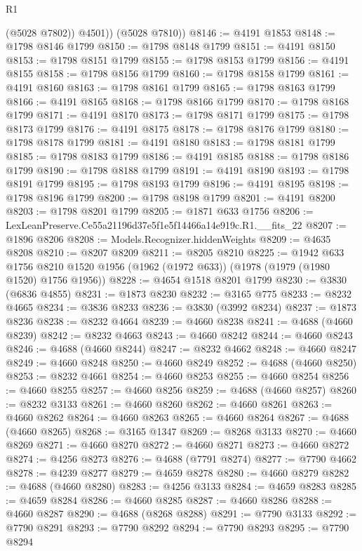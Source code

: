 \begin{lexlean}{R1}
\begin{coremodule}
            (@5028 @7802))
          @4501))
      (@5028 @7810))
@8146 := @4191 @1853
@8148 := @1798 @8146 @1799
@8150 := @1798 @8148 @1799
@8151 := @4191 @8150
@8153 := @1798 @8151 @1799
@8155 := @1798 @8153 @1799
@8156 := @4191 @8155
@8158 := @1798 @8156 @1799
@8160 := @1798 @8158 @1799
@8161 := @4191 @8160
@8163 := @1798 @8161 @1799
@8165 := @1798 @8163 @1799
@8166 := @4191 @8165
@8168 := @1798 @8166 @1799
@8170 := @1798 @8168 @1799
@8171 := @4191 @8170
@8173 := @1798 @8171 @1799
@8175 := @1798 @8173 @1799
@8176 := @4191 @8175
@8178 := @1798 @8176 @1799
@8180 := @1798 @8178 @1799
@8181 := @4191 @8180
@8183 := @1798 @8181 @1799
@8185 := @1798 @8183 @1799
@8186 := @4191 @8185
@8188 := @1798 @8186 @1799
@8190 := @1798 @8188 @1799
@8191 := @4191 @8190
@8193 := @1798 @8191 @1799
@8195 := @1798 @8193 @1799
@8196 := @4191 @8195
@8198 := @1798 @8196 @1799
@8200 := @1798 @8198 @1799
@8201 := @4191 @8200
@8203 := @1798 @8201 @1799
@8205 := @1871 @633 @1756
@8206 := LexLeanPreserve.Ce55a21196d37e5f1e5f14466a14e919c.R1.__fits_22
@8207 := @1896 @8206
@8208 := Models.Recognizer.hiddenWeights
@8209 := @4635 @8208
@8210 := @8207 @8209
@8211 := @8205 @8210
@8225 := @1942
    @633
    @1756
    @8210
    @1520
    @1956
    (@1962 (@1972 @633))
    (@1978 (@1979 (@1980 @1520) @1756 @1956))
@8228 := @4654 @1518 @8201 @1799
@8230 := @3830 (@6836 @4855)
@8231 := @1873 @8230
@8232 := @3165 @775
@8233 := @8232 @4665
@8234 := @3836 @8233
@8236 := @3830 (@3992 @8234)
@8237 := @1873 @8236
@8238 := @8232 @4664
@8239 := @4660 @8238
@8241 := @4688 (@4660 @8239)
@8242 := @8232 @4663
@8243 := @4660 @8242
@8244 := @4660 @8243
@8246 := @4688 (@4660 @8244)
@8247 := @8232 @4662
@8248 := @4660 @8247
@8249 := @4660 @8248
@8250 := @4660 @8249
@8252 := @4688 (@4660 @8250)
@8253 := @8232 @4661
@8254 := @4660 @8253
@8255 := @4660 @8254
@8256 := @4660 @8255
@8257 := @4660 @8256
@8259 := @4688 (@4660 @8257)
@8260 := @8232 @3133
@8261 := @4660 @8260
@8262 := @4660 @8261
@8263 := @4660 @8262
@8264 := @4660 @8263
@8265 := @4660 @8264
@8267 := @4688 (@4660 @8265)
@8268 := @3165 @1347
@8269 := @8268 @3133
@8270 := @4660 @8269
@8271 := @4660 @8270
@8272 := @4660 @8271
@8273 := @4660 @8272
@8274 := @4256 @8273
@8276 := @4688 (@7791 @8274)
@8277 := @7790 @4662
@8278 := @4239 @8277
@8279 := @4659 @8278
@8280 := @4660 @8279
@8282 := @4688 (@4660 @8280)
@8283 := @4256 @3133
@8284 := @4659 @8283
@8285 := @4659 @8284
@8286 := @4660 @8285
@8287 := @4660 @8286
@8288 := @4660 @8287
@8290 := @4688 (@8268 @8288)
@8291 := @7790 @3133
@8292 := @7790 @8291
@8293 := @7790 @8292
@8294 := @7790 @8293
@8295 := @7790 @8294

\end{coremodule}
\end{lexlean}
